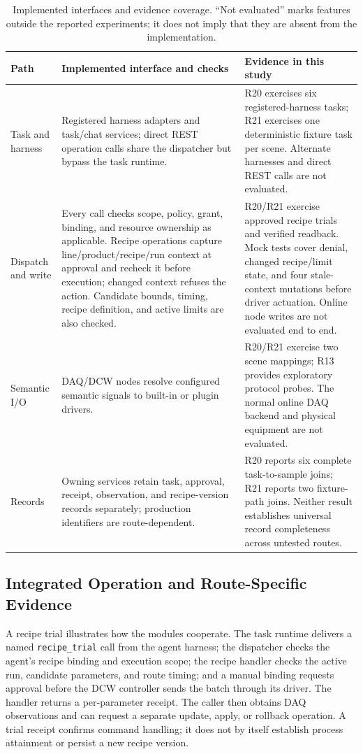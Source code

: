 \begin{table}[!t]
\centering
\caption{Implemented interfaces and evidence coverage. “Not evaluated” marks
features outside the reported experiments; it does not imply that they are
absent from the implementation.}
\label{tab:coverage}
\footnotesize
\setlength{\tabcolsep}{3pt}
\begin{tabularx}{\textwidth}{@{}p{2.0cm}X X@{}}
\toprule
Path & Implemented interface and checks & Evidence in this study \\
\midrule
Task and harness & Registered harness adapters and task/chat services; direct REST operation calls share the dispatcher but bypass the task runtime. & R20 exercises six registered-harness tasks; R21 exercises one deterministic fixture task per scene. Alternate harnesses and direct REST calls are not evaluated. \\
Dispatch and write & Every call checks scope, policy, grant, binding, and resource ownership as applicable. Recipe operations capture line/product/recipe/run context at approval and recheck it before execution; changed context refuses the action. Candidate bounds, timing, recipe definition, and active limits are also checked. & R20/R21 exercise approved recipe trials and verified readback. Mock tests cover denial, changed recipe/limit state, and four stale-context mutations before driver actuation. Online node writes are not evaluated end to end. \\
Semantic I/O & DAQ/DCW nodes resolve configured semantic signals to built-in or plugin drivers. & R20/R21 exercise two scene mappings; R13 provides exploratory protocol probes. The normal online DAQ backend and physical equipment are not evaluated. \\
Records & Owning services retain task, approval, receipt, observation, and recipe-version records separately; production identifiers are route-dependent. & R20 reports six complete task-to-sample joins; R21 reports two fixture-path joins. Neither result establishes universal record completeness across untested routes. \\
\bottomrule
\end{tabularx}
\end{table}

\subsection{Integrated Operation and Route-Specific Evidence}
\label{sec:tasklifecycle}
A recipe trial illustrates how the modules cooperate. The task runtime
delivers a named \texttt{recipe\_trial} call from the agent harness; the
dispatcher checks the agent's recipe binding and execution scope; the recipe
handler checks the active run, candidate parameters, and route timing; and a
manual binding requests approval before the DCW controller sends the batch
through its driver. The handler returns a per-parameter receipt. The caller
then obtains DAQ observations and can request a separate update, apply, or
rollback operation. A trial receipt confirms command handling; it does not
by itself establish process attainment or persist a new recipe version.

